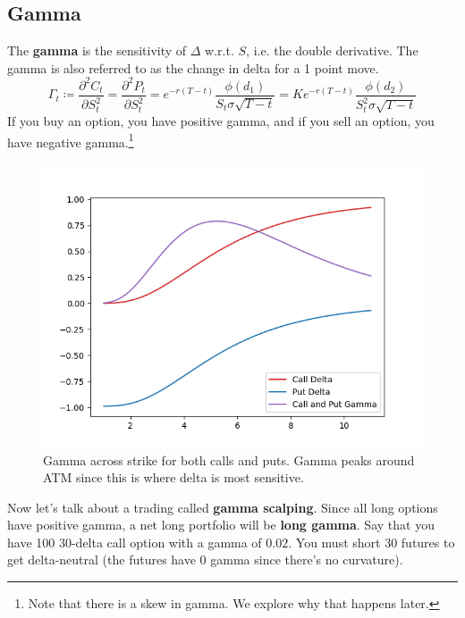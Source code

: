\documentclass{article}
\begin{document}
  \subsection{Gamma}

    \begin{definition}[Gamma]
      The \textbf{gamma} is the sensitivity of $\Delta$ w.r.t. $S$, i.e. the double derivative. The gamma is also referred to as the change in delta for a 1 point move. 
      \begin{equation}
        \Gamma_t \coloneqq \frac{\partial^2 C_t }{\partial S_t^2} = \frac{\partial^2 P_t}{\partial S_t^2} = e^{-r(T - t)} \frac{\phi(d_1)}{S_t \sigma \sqrt{T - t}} = K e^{-r(T - t)} \frac{\phi(d_2)}{S_t^2 \sigma \sqrt{T - t}}
      \end{equation}
      If you buy an option, you have positive gamma, and if you sell an option, you have negative gamma.\footnote{Note that there is a skew in gamma. We explore why that happens later. }
      \begin{figure}[H]
        \centering 
        \includegraphics[scale=0.45]{img/gamma.png}
        \caption{Gamma across strike for both calls and puts. Gamma peaks around ATM since this is where delta is most sensitive. }
        \label{fig:gamma_across_strike}
      \end{figure}
    \end{definition}

    Now let's talk about a trading called \textbf{gamma scalping}. Since all long options have positive gamma, a net long portfolio will be \textbf{long gamma}. Say that you have 100 $30$-delta call option with a gamma of $0.02$. You must short $30$ futures to get delta-neutral (the futures have $0$ gamma since there's no curvature).
\end{document}
